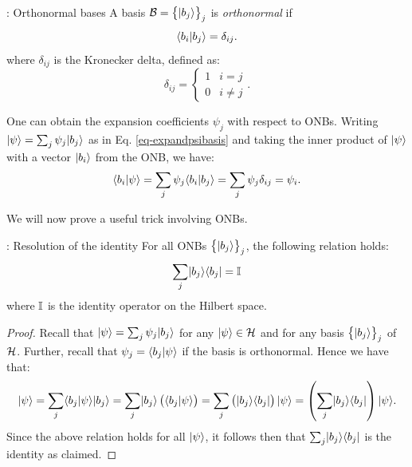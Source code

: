 \begin{defbox}{: Orthonormal bases}\label{def-ONB}
    A basis $\mathcal{B} = \set{\lvert b_j \rangle}_j$ is \emph{orthonormal} if
    \begin{equation}
        \langle b_i \lvert b_j \rangle = \delta_{ij}.
    \end{equation}
    where $\delta_{ij}$ is the Kronecker delta, defined as:
    \begin{equation}
        \delta_{ij} = \begin{cases}
            1 & i = j
            \\ 0 & i \neq j
        \end{cases}.
    \end{equation}

    One can obtain the expansion coefficients $\psi_j$ with respect to ONBs. Writing $\lvert \psi \rangle = \sum_j \psi_j \lvert b_j \rangle$ as in Eq. \eqref{eq-expandpsibasis} and taking the inner product of $\lvert \psi \rangle$ with a vector $\lvert b_i \rangle$ from the ONB, we have:
    \begin{equation}
        \langle b_i \lvert \psi \rangle = \sum_j \psi_j \langle b_i \lvert b_j \rangle = \sum_j \psi_j \delta_{ij} = \psi_i.
    \end{equation}
\end{defbox}

We will now prove a useful trick involving ONBs.

\begin{propbox}{: Resolution of the identity}\label{thm-residentity}
    For all ONBs $\set{\lvert b_j \rangle}_j$, the following relation holds:
    \begin{equation}
        \sum_j \lvert b_j \rangle \langle b_j \rvert = \mathbb{I}
    \end{equation}
    where $\mathbb{I}$ is the identity operator on the Hilbert space.
\end{propbox}

\begin{proof}
    Recall that $\lvert \psi \rangle = \sum_j \psi_j \lvert b_j \rangle$ for any $\lvert \psi \rangle \in \mathcal{H}$ and for any basis $\set{\lvert b_j \rangle}_j$ of $\mathcal{H}$. Further, recall that $\psi_j = \langle b_j \lvert \psi \rangle$ if the basis is orthonormal. Hence we have that:
    \begin{equation}
        \lvert \psi \rangle = \sum_j \langle b_j \lvert \psi \rangle\lvert b_j \rangle = \sum_j \lvert b_j \rangle\left(\langle b_j \lvert \psi \rangle\right) = \sum_j \left(\lvert b_j \rangle \langle b_j \rvert\right)\lvert \psi \rangle = \left(\sum_j \lvert b_j \rangle \langle b_j \rvert\right)\lvert \psi \rangle.
    \end{equation}
    Since the above relation holds for all $\lvert \psi \rangle$, it follows then that $\sum_j\lvert b_j \rangle \langle b_j \rvert$ is the identity as claimed.
\end{proof}

